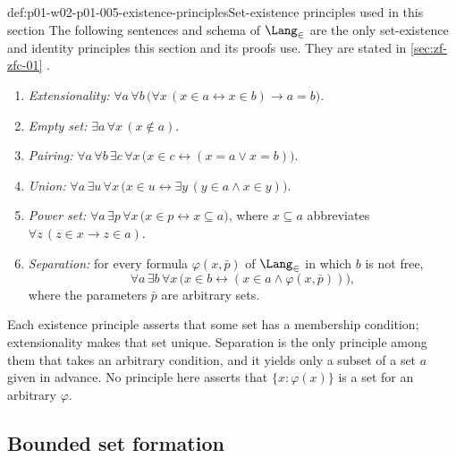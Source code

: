 \begin{hbconvention}{def:p01-w02-p01-005-existence-principles}{Set-existence principles used in this section}
The following sentences and schema of \(\Lang_{\in}\) are the only
set-existence and identity principles this section and its proofs use. They
are stated in \cref{sec:zf-zfc-01} \cite[ch.~``The Axioms of ZF and ZFC'',
definitions ``Extensionality'', ``Empty set'', ``Pairing, union, and power
set'' and ``Separation schema'']{FrozenFormalLogicSetOperations}.
\begin{enumerate}
  \item \emph{Extensionality:}
        \(\forall a\,\forall b\,
          \bigl(\forall x\,(x\in a\leftrightarrow x\in b)\to a=b\bigr)\).
  \item \emph{Empty set:} \(\exists a\,\forall x\,(x\notin a)\).
  \item \emph{Pairing:} \(\forall a\,\forall b\,\exists c\,\forall x\,
          \bigl(x\in c\leftrightarrow(x=a\lor x=b)\bigr)\).
  \item \emph{Union:} \(\forall a\,\exists u\,\forall x\,
          \bigl(x\in u\leftrightarrow\exists y\,(y\in a\land x\in y)\bigr)\).
  \item \emph{Power set:} \(\forall a\,\exists p\,\forall x\,
          \bigl(x\in p\leftrightarrow x\subseteq a\bigr)\), where
          \(x\subseteq a\) abbreviates \(\forall z\,(z\in x\to z\in a)\).
  \item \emph{Separation:} for every formula \(\varphi(x,\bar p)\) of
        \(\Lang_{\in}\) in which \(b\) is not free,
        \[
          \forall a\,\exists b\,\forall x\,
          \bigl(x\in b\leftrightarrow(x\in a\land\varphi(x,\bar p))\bigr),
        \]
        where the parameters \(\bar p\) are arbitrary sets.
\end{enumerate}
Each existence principle asserts that some set has a membership condition;
extensionality makes that set unique. Separation is the only principle among
them that takes an arbitrary condition, and it yields only a subset of a set
\(a\) given in advance. No principle here asserts that \(\{x:\varphi(x)\}\) is
a set for an arbitrary \(\varphi\).
\end{hbconvention}

\subsection{Bounded set formation}
\label{sec:p01-w02-p01-005-bounded}

